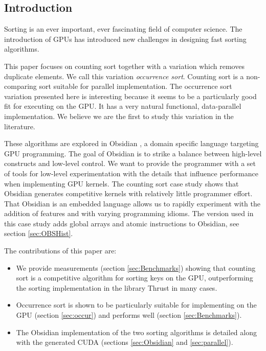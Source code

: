 \subsection{Introduction} 

Sorting is an ever important, ever fascinating field of computer
science. The introduction of GPUs has introduced new challenges in
designing fast sorting algorithms.

This paper focuses on counting sort together with a variation which
removes duplicate elements. We call this variation
{\em occurrence sort}. Counting sort is a non-comparing sort
suitable for parallel implementation. The occurrence sort variation 
presented here is interesting because it seems to be a particularly
good fit for executing on the GPU. It has a very natural functional,
data-parallel implementation. We believe we are the first to study
this variation in the literature.

These algorithms are explored in Obsidian \cite{JSLIC,PUSH}, a domain
specific language targeting GPU programming. The goal of Obsidian is
to strike a balance between high-level constructs and low-level control. 
We want to provide the programmer with a set of tools for low-level 
experimentation with the details that influence performance when 
implementing GPU kernels. The counting sort
case study shows that Obsidian generates competitive kernels with
relatively little programmer effort. That Obsidian is an embedded language 
allows us to rapidly experiment with the addition of features and with varying 
programming idioms. The version used in this case study
adds global arrays and atomic instructions to Obsidian, see section 
\ref{sec:OBSHist}. 

The contributions of this paper are:
\begin{itemize}
\item We provide measurements (section \ref{sec:Benchmarks}) showing
  that counting sort is a competitive algorithm for sorting keys on the GPU,
  outperforming the sorting implementation in the library
  Thrust\cite{THRUST} in many cases.
\item Occurrence sort is shown to be particularly
  suitable for implementing on the GPU (section \ref{sec:occur}) and
  performs well (section \ref{sec:Benchmarks}).
\item The Obsidian implementation of the two sorting algorithms is
  detailed along with the generated CUDA (sections
  \ref{sec:Obsidian} and \ref{sec:parallel}).
\end{itemize}


